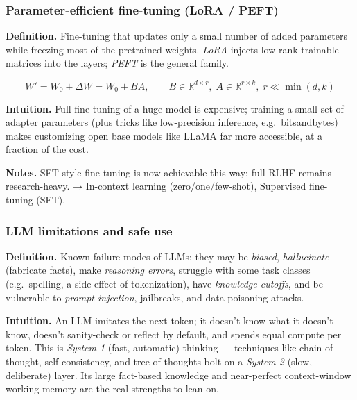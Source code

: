 \documentclass[
  10pt,
  letterpaper,
  onecolumn]{article}
\begin{document}
\hypertarget{parameter-efficient-fine-tuning-lora-peft}{%
\subsubsection{Parameter-efficient fine-tuning (LoRA /
PEFT)}\label{parameter-efficient-fine-tuning-lora-peft}}

\textbf{Definition.} Fine-tuning that updates only a small number of
added parameters while freezing most of the pretrained weights.
\emph{LoRA} injects low-rank trainable matrices into the layers;
\emph{PEFT} is the general family.

\begin{equation*}
W'=W_0+\Delta W=W_0+BA,
\qquad
B\in\mathbb{R}^{d\times r},\;A\in\mathbb{R}^{r\times k},\;r\ll\min(d,k)
\end{equation*}

\textbf{Intuition.} Full fine-tuning of a huge model is expensive;
training a small set of adapter parameters (plus tricks like
low-precision inference, e.g.~bitsandbytes) makes customizing open base
models like LLaMA far more accessible, at a fraction of the cost.

\textbf{Notes.} SFT-style fine-tuning is now achievable this way; full
RLHF remains research-heavy. → In-context learning (zero/one/few-shot),
Supervised fine-tuning (SFT).

\hypertarget{llm-limitations-and-safe-use}{%
\subsubsection{LLM limitations and safe
use}\label{llm-limitations-and-safe-use}}

\textbf{Definition.} Known failure modes of LLMs: they may be
\emph{biased}, \emph{hallucinate} (fabricate facts), make
\emph{reasoning errors}, struggle with some task classes (e.g.~spelling,
a side effect of tokenization), have \emph{knowledge cutoffs}, and be
vulnerable to \emph{prompt injection}, jailbreaks, and data-poisoning
attacks.

\textbf{Intuition.} An LLM imitates the next token; it doesn't know what
it doesn't know, doesn't sanity-check or reflect by default, and spends
equal compute per token. This is \emph{System 1} (fast, automatic)
thinking --- techniques like chain-of-thought, self-consistency, and
tree-of-thoughts bolt on a \emph{System 2} (slow, deliberate) layer. Its
large fact-based knowledge and near-perfect context-window working
memory are the real strengths to lean on.
\end{document}
